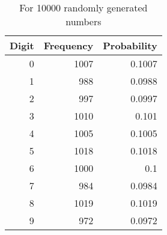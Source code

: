 \begin{table}[htbp]
\renewcommand\thetable{3}
  \centering
  \caption{For 10000 randomly generated numbers}
    \begin{tabular}{|r|r|r|}
    \toprule
    \hline
    \multicolumn{1}{|c|}{\textbf{Digit}} & \multicolumn{1}{c|}{\textbf{Frequency}} & \multicolumn{1}{c|}{\textbf{Probability}} \\
    \midrule
    \hline
    0     & 1007  & 0.1007 \\
    1     & 988   & 0.0988 \\
    2     & 997   & 0.0997 \\
    3     & 1010  & 0.101 \\
    4     & 1005  & 0.1005 \\
    5     & 1018  & 0.1018 \\
    6     & 1000  & 0.1 \\
    7     & 984   & 0.0984 \\
    8     & 1019  & 0.1019 \\
    9     & 972   & 0.0972 \\
    \hline
    \end{tabular}%
  \label{tab:addlabel}%
\end{table}%
